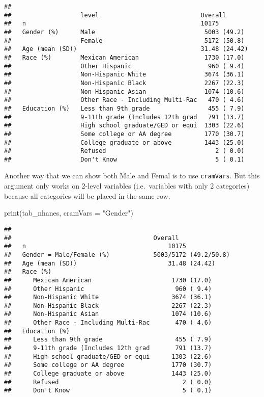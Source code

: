 \documentclass[
]{book}
\newenvironment{Shaded}{\begin{snugshade}}{\end{snugshade}}
\newcommand{\AttributeTok}[1]{\textcolor[rgb]{0.77,0.63,0.00}{#1}}
\newcommand{\FunctionTok}[1]{\textcolor[rgb]{0.00,0.00,0.00}{#1}}
\newcommand{\NormalTok}[1]{#1}
\newcommand{\StringTok}[1]{\textcolor[rgb]{0.31,0.60,0.02}{#1}}
\begin{document}
\begin{verbatim}
##
##                   level                            Overall
##   n                                                10175
##   Gender (%)      Male                              5003 (49.2)
##                   Female                            5172 (50.8)
##   Age (mean (SD))                                  31.48 (24.42)
##   Race (%)        Mexican American                  1730 (17.0)
##                   Other Hispanic                     960 ( 9.4)
##                   Non-Hispanic White                3674 (36.1)
##                   Non-Hispanic Black                2267 (22.3)
##                   Non-Hispanic Asian                1074 (10.6)
##                   Other Race - Including Multi-Rac   470 ( 4.6)
##   Education (%)   Less than 9th grade                455 ( 7.9)
##                   9-11th grade (Includes 12th grad   791 (13.7)
##                   High school graduate/GED or equi  1303 (22.6)
##                   Some college or AA degree         1770 (30.7)
##                   College graduate or above         1443 (25.0)
##                   Refused                              2 ( 0.0)
##                   Don't Know                           5 ( 0.1)
\end{verbatim}

Another way that we can show both Male and Femal is to use \texttt{cramVars}. But this argument only works on 2-level variables (i.e.~variables with only 2 categories) because all categories will be placed in the same row.

\begin{Shaded}
\begin{Highlighting}[]
\FunctionTok{print}\NormalTok{(tab\_nhanes, }
     \AttributeTok{cramVars =} \StringTok{"Gender"}\NormalTok{)}
\end{Highlighting}
\end{Shaded}

\begin{verbatim}
##
##                                       Overall
##   n                                       10175
##   Gender = Male/Female (%)            5003/5172 (49.2/50.8)
##   Age (mean (SD))                         31.48 (24.42)
##   Race (%)
##      Mexican American                      1730 (17.0)
##      Other Hispanic                         960 ( 9.4)
##      Non-Hispanic White                    3674 (36.1)
##      Non-Hispanic Black                    2267 (22.3)
##      Non-Hispanic Asian                    1074 (10.6)
##      Other Race - Including Multi-Rac       470 ( 4.6)
##   Education (%)
##      Less than 9th grade                    455 ( 7.9)
##      9-11th grade (Includes 12th grad       791 (13.7)
##      High school graduate/GED or equi      1303 (22.6)
##      Some college or AA degree             1770 (30.7)
##      College graduate or above             1443 (25.0)
##      Refused                                  2 ( 0.0)
##      Don't Know                               5 ( 0.1)
\end{verbatim}
\end{document}

